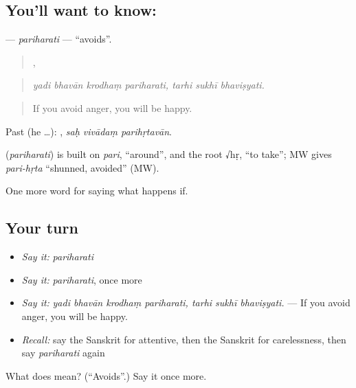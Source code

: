 \subsection*{You'll want to know: }
\textbf{} — \emph{pariharati} — \textquotedblleft{}avoids\textquotedblright{}.

\begin{quote}
   ,   
\end{quote}

\begin{quote}
\emph{yadi bhavān krodhaṃ pariharati, tarhi sukhī bhaviṣyati.}
\end{quote}

\begin{quote}
If you avoid anger, you will be happy.
\end{quote}

Past (he …):   , \emph{saḥ vivādaṃ parihṛtavān}.

\begin{cousinweb}
\textbf{} (\emph{pariharati}) is built on \emph{pari}, \textquotedblleft{}around\textquotedblright{}, and the root √hṛ, \textquotedblleft{}to take\textquotedblright{}; MW gives \emph{pari-hṛta} \textquotedblleft{}shunned, avoided\textquotedblright{} (MW).
\end{cousinweb}

\begin{grammarlens}[title={What you've built}]
One more word for saying what happens if.
\end{grammarlens}

\subsection*{Your turn}
\begin{itemize}
\raggedright
  \item \emph{Say it:} \emph{pariharati}
  \item \emph{Say it:} \emph{pariharati}, once more
  \item \emph{Say it:} \emph{yadi bhavān krodhaṃ pariharati, tarhi sukhī bhaviṣyati.} — If you avoid anger, you will be happy.
  \item \emph{Recall:} say the Sanskrit for attentive, then the Sanskrit for carelessness, then say \emph{pariharati} again
\end{itemize}

\begin{tcolorbox}[breakable,colback=teal!4,colframe=teal!35!black,title={Before you move on}]
What does  mean? (\textquotedblleft{}Avoids\textquotedblright{}.) Say it once more.
\end{tcolorbox}
